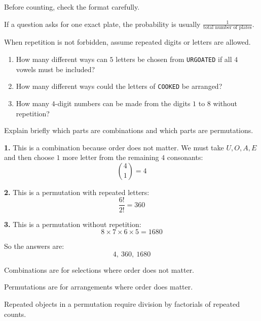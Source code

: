 \begin{takeaways}
\item Before counting, check the format carefully.
\item If a question asks for one exact plate, the probability is usually $\frac{1}{\text{total number of plates}}$.
\item When repetition is not forbidden, assume repeated digits or letters are allowed.
\end{takeaways}

\begin{problem}
\begin{enumerate}[label=\arabic*.]
\item How many different ways can $5$ letters be chosen from \texttt{URGOATED} if all $4$ vowels must be included?
\item How many different ways could the letters of \texttt{COOKED} be arranged?
\item How many $4$-digit numbers can be made from the digits $1$ to $8$ without repetition?
\end{enumerate}

Explain briefly which parts are combinations and which parts are permutations.
\end{problem}

\begin{solution}
\textbf{1.} This is a combination because order does not matter. We must take $U, O, A, E$ and then choose $1$ more letter from the remaining $4$ consonants:
\[
\binom{4}{1} = 4
\]

\textbf{2.} This is a permutation with repeated letters:
\[
\frac{6!}{2!} = 360
\]

\textbf{3.} This is a permutation without repetition:
\[
8 \times 7 \times 6 \times 5 = 1680
\]

So the answers are:
\[
\boxed{4,\ 360,\ 1680}
\]
\end{solution}

\begin{takeaways}
\item Combinations are for selections where order does not matter.
\item Permutations are for arrangements where order does matter.
\item Repeated objects in a permutation require division by factorials of repeated counts.
\end{takeaways}
